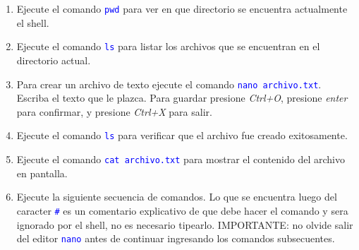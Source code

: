 \documentclass[12pt]{article}
\newcommand{\cw}[1]{\mbox{\texttt{\textcolor{blue}{#1}}}}
\begin{document}
\begin{enumerate}[resume]

    \item Ejecute el comando \cw{pwd} para ver en que directorio se encuentra
        actualmente el shell.

    \item Ejecute el comando \cw{ls} para listar los archivos que se
        encuentran en el directorio actual.

    \item Para crear un archivo de texto ejecute el comando \cw{nano
        archivo.txt}. Escriba el texto que le plazca. Para guardar presione
        \emph{Ctrl+O}, presione \emph{enter} para confirmar, y presione
        \emph{Ctrl+X} para salir.

    \item Ejecute el comando \cw{ls} para verificar que el archivo fue creado
        exitosamente.

    \item Ejecute el comando \cw{cat archivo.txt} para mostrar el contenido
        del archivo en pantalla.

    \item Ejecute la siguiente secuencia de comandos. Lo que se encuentra
        luego del caracter \cw{\#} es un comentario explicativo de que debe
        hacer el comando y sera ignorado por el shell, no es necesario
        tipearlo. IMPORTANTE: no olvide salir del editor \cw{nano} antes de
        continuar ingresando los comandos subsecuentes.

    \begin{center}


\end{center}
\end{enumerate}
\end{document}
